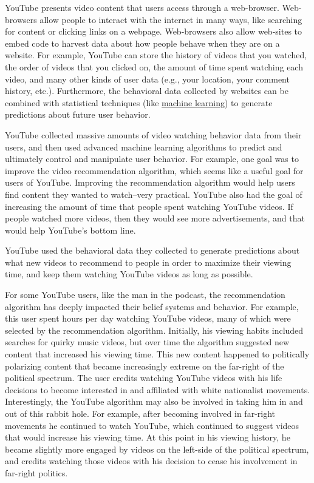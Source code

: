 \documentclass[
  oneside,
  12pt]{crumpbook}
\begin{document}
YouTube presents video content that users access through a web-browser. Web-browsers allow people to interact with the internet in many ways, like searching for content or clicking links on a webpage. Web-browsers also allow web-sites to embed code to harvest data about how people behave when they are on a website. For example, YouTube can store the history of videos that you watched, the order of videos that you clicked on, the amount of time spent watching each video, and many other kinds of user data (e.g., your location, your comment history, etc.). Furthermore, the behavioral data collected by websites can be combined with statistical techniques (like \href{https://en.wikipedia.org/wiki/Machine_learning}{machine learning}) to generate predictions about future user behavior.

YouTube collected massive amounts of video watching behavior data from their users, and then used advanced machine learning algorithms to predict and ultimately control and manipulate user behavior. For example, one goal was to improve the video recommendation algorithm, which seems like a useful goal for users of YouTube. Improving the recommendation algorithm would help users find content they wanted to watch--very practical. YouTube also had the goal of increasing the amount of time that people spent watching YouTube videos. If people watched more videos, then they would see more advertisements, and that would help YouTube's bottom line.

YouTube used the behavioral data they collected to generate predictions about what new videos to recommend to people in order to maximize their viewing time, and keep them watching YouTube videos as long as possible.

For some YouTube users, like the man in the podcast, the recommendation algorithm has deeply impacted their belief systems and behavior. For example, this user spent hours per day watching YouTube videos, many of which were selected by the recommendation algorithm. Initially, his viewing habits included searches for quirky music videos, but over time the algorithm suggested new content that increased his viewing time. This new content happened to politically polarizing content that became increasingly extreme on the far-right of the political spectrum. The user credits watching YouTube videos with his life decisions to become interested in and affiliated with white nationalist movements. Interestingly, the YouTube algorithm may also be involved in taking him in and out of this rabbit hole. For example, after becoming involved in far-right movements he continued to watch YouTube, which continued to suggest videos that would increase his viewing time. At this point in his viewing history, he became slightly more engaged by videos on the left-side of the political spectrum, and credits watching those videos with his decision to cease his involvement in far-right politics.
\end{document}
